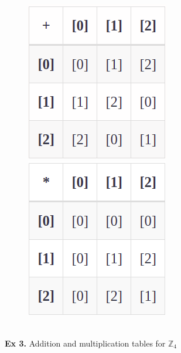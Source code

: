 \documentclass{article}
\begin{document}
\begin{figure}[h]
\centering
\includegraphics[scale=0.66]{11_5_2a.png}
\includegraphics[scale=0.66]{11_5_2b.png}
\end{figure}\\
\newpage
\noindent\textbf{Ex 3.} Addition and multiplication tables for $\mathbb{Z}_4$
\end{document}
